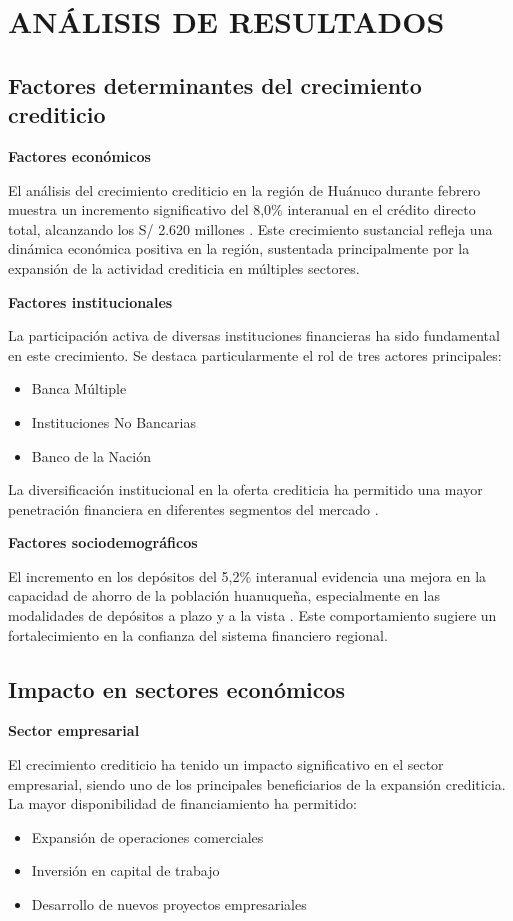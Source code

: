 \documentclass[12pt, a4paper]{article}
\begin{document}
\section{ANÁLISIS DE RESULTADOS}

\subsection{Factores determinantes del crecimiento crediticio}

\textbf{Factores económicos}  

El análisis del crecimiento crediticio en la región de Huánuco durante febrero muestra un incremento significativo del 8,0\% interanual en el crédito directo total, alcanzando los S/ 2.620 millones \textcite{BCRP2024}. Este crecimiento sustancial refleja una dinámica económica positiva en la región, sustentada principalmente por la expansión de la actividad crediticia en múltiples sectores.

\textbf{Factores institucionales}

La participación activa de diversas instituciones financieras ha sido fundamental en este crecimiento. Se destaca particularmente el rol de tres actores principales:
\begin{itemize}
    \item Banca Múltiple
    \item Instituciones No Bancarias
    \item Banco de la Nación
\end{itemize}

La diversificación institucional en la oferta crediticia ha permitido una mayor penetración financiera en diferentes segmentos del mercado \textcite{SBS2024}.

\textbf{Factores sociodemográficos}

El incremento en los depósitos del 5,2\% interanual evidencia una mejora en la capacidad de ahorro de la población huanuqueña, especialmente en las modalidades de depósitos a plazo y a la vista \textcite{BCRP2024}. Este comportamiento sugiere un fortalecimiento en la confianza del sistema financiero regional.

\subsection{Impacto en sectores económicos}

\textbf{Sector empresarial}

El crecimiento crediticio ha tenido un impacto significativo en el sector empresarial, siendo uno de los principales beneficiarios de la expansión crediticia. La mayor disponibilidad de financiamiento ha permitido:
\begin{itemize}
    \item Expansión de operaciones comerciales
    \item Inversión en capital de trabajo
    \item Desarrollo de nuevos proyectos empresariales
\end{itemize}
\end{document}
